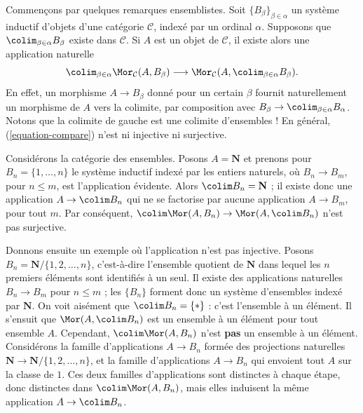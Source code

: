\medskip\noindent
Commençons par quelques remarques ensemblistes.
Soit $\{B_{\beta}\}_{\beta \in \alpha}$ un système inductif d'objets d'une
catégorie $\mathcal{C}$, indexé par un ordinal $\alpha$. Supposons que
$\colim_{\beta \in \alpha} B_\beta$ existe dans $\mathcal{C}$. Si $A$ est un
objet de $\mathcal{C}$, il existe alors une application naturelle
\begin{equation}
\label{equation-compare}
\colim_{\beta \in \alpha} \Mor_\mathcal{C}(A, B_\beta)
\longrightarrow
\Mor_\mathcal{C}(A, \colim_{\beta \in \alpha} B_\beta).
\end{equation}
En effet, un morphisme $A \to B_\beta$ donné pour un certain $\beta$ fournit
naturellement un morphisme de $A$ vers la colimite, par composition avec
$B_\beta \to \colim_{\beta \in \alpha} B_\alpha$.
Notons que la colimite de gauche est une colimite d'ensembles ! En général,
(\ref{equation-compare}) n'est ni injective ni surjective.

\begin{example}
\label{example-not-surjective}
Considérons la catégorie des ensembles. Posons $A = \mathbf{N}$ et prenons
pour $B_n = \{1, \ldots, n\}$ le système inductif indexé par les entiers
naturels, où $B_n \to B_m$, pour $n \leq m$, est l'application évidente.
Alors $\colim B_n = \mathbf{N}$ ; il existe donc une application
$A \to \colim B_n$ qui ne se factorise par aucune application $A \to B_m$,
pour tout $m$.
Par conséquent,
$\colim \Mor(A, B_n) \to \Mor(A, \colim B_n)$
n'est pas surjective.
\end{example}

\begin{example}
\label{example-not-injective}
Donnons ensuite un exemple où l'application n'est pas injective. Posons
$B_n = \mathbf{N}/\{1, 2, \ldots, n\}$, c'est-à-dire l'ensemble quotient de
$\mathbf{N}$ dans lequel les $n$ premiers éléments sont identifiés à un seul.
Il existe des applications naturelles $B_n \to B_m$ pour $n \leq m$ ; les
$\{B_n\}$ forment donc un système d'ensembles indexé par $\mathbf{N}$. On voit
aisément que $\colim B_n = \{*\}$ : c'est l'ensemble à un élément. Il s'ensuit
que $\Mor(A, \colim B_n)$ est un ensemble à un élément pour tout ensemble $A$.
Cependant, $\colim \Mor(A , B_n)$ n'est {\bf pas} un ensemble à un élément.
Considérons la famille d'applications $A \to B_n$ formée des projections
naturelles $\mathbf{N} \to \mathbf{N}/\{1, 2, \ldots, n\}$, et la famille
d'applications $A \to B_n$ qui envoient tout $A$ sur la classe de $1$.
Ces deux familles d'applications sont distinctes à chaque étape, donc distinctes
dans $\colim \Mor(A, B_n)$, mais elles induisent la même application
$A \to \colim B_n$.
\end{example}

